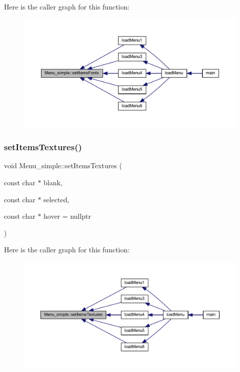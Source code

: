 Here is the caller graph for this function\+:\nopagebreak
\begin{figure}[H]
\begin{center}
\leavevmode
\includegraphics[width=350pt]{class_menu__simple_a1273e6743ee892cd8651968efd595b73_icgraph}
\end{center}
\end{figure}
\mbox{\label{class_menu__simple_a4717470decb5666cbac7aa879aade5fa}} 
\subsubsection{\texorpdfstring{set\+Items\+Textures()}{setItemsTextures()}}
{\footnotesize\ttfamily void Menu\+\_\+simple\+::set\+Items\+Textures (\begin{DoxyParamCaption}\item[{const char $\ast$}]{blank,  }\item[{const char $\ast$}]{selected,  }\item[{const char $\ast$}]{hover = {\ttfamily nullptr} }\end{DoxyParamCaption})\hspace{0.3cm}{\ttfamily [virtual]}}

Here is the caller graph for this function\+:\nopagebreak
\begin{figure}[H]
\begin{center}
\leavevmode
\includegraphics[width=350pt]{class_menu__simple_a4717470decb5666cbac7aa879aade5fa_icgraph}
\end{center}
\end{figure}


